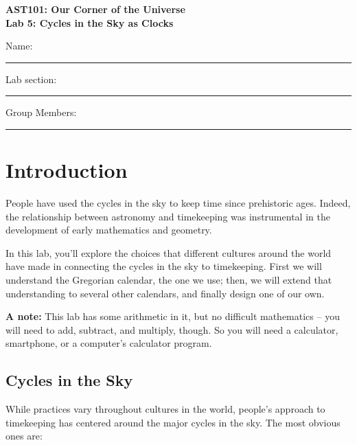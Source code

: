 \documentclass[11pt]{article}
\begin{document}
\begin{center}
\textbf{\Large
AST101: Our Corner of the Universe \\
\vspace*{0.1cm}
Lab 5: Cycles in the Sky as Clocks
}
\end{center}

\vspace*{0.5cm}

{\Large Name:}\vspace*{0.5cm}\\\hrule
{\Large Lab section:}\vspace*{0.5cm}\\\hrule
{\Large Group Members:}\vspace*{0.5cm}\\\hrule
\vspace*{0.5cm}

\section{Introduction}

People have used the cycles in the sky to keep time since prehistoric ages. Indeed, the relationship between astronomy and timekeeping was instrumental in the development of early mathematics and geometry.

In this lab, you'll explore the choices that different cultures around the world have made in connecting the cycles in the sky to timekeeping. First we will understand the Gregorian calendar, the one we use; then, we will extend that understanding to several other calendars, and finally design one of our own.

{\bf A note:} This lab has some arithmetic in it, but no difficult mathematics -- you will need to add, subtract, and multiply, though. So you will need a calculator, smartphone, or a computer's calculator program.

\subsection{Cycles in the Sky}

While practices vary throughout cultures in the world, people's approach to timekeeping has centered around the major cycles in the sky. The most obvious ones are:
\end{document}
